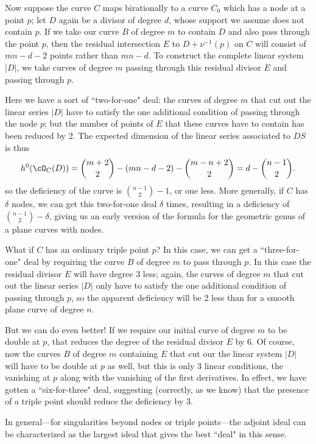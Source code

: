 Now suppose the curve $C$ maps birationally to a curve $C_0$ which has a node at a point $p$; let $D$ again be a divisor of degree $d$, whose support we assume does not contain $p$. If we take our curve $B$ of degree $m$ to contain $D$ and also pass through the point $p$, then the residual intersection $E$ to $D+\nu^{-1}(p)$ on $C$ will consist of $mn-d-2$ points rather than $mn-d$. To construct the complete linear system $|D|$, we take curves of degree $m$ passing through this residual divisor $E$ and passing through $p$.

Here we have a sort of ``two-for-one" deal: the curves of degree $m$ that cut out the linear series $|D|$ have to satisfy the one additional condition of passing through the node $p$; but the number of points of $E$ that these curves have to contain has been reduced by 2. The expected dimension of the linear series associated to $DS$ is thus
$$
h^0(\cO_C(D)) = \binom{m+2}{2} - (mn-d-2) -  \binom{m-n+2}{2} = d  - \binom{n-1}{2}.
$$
so the deficiency of the curve is $\binom{n-1}{2}-1$, or one less. More generally, if $C$ has $\delta$ nodes, we can get this two-for-one deal $\delta$ times, resulting in a deficiency of $\binom{n-1}{2} - \delta$, giving us an early version of the formula for the  geometric genus of a plane curves with nodes.

What if $C$ has an ordinary triple point $p$? In this case, we can get a ``three-for-one" deal by requiring the curve $B$ of degree $m$ to pass through $p$. In this case the residual divisor $E$ will have degree 3 less; again, the curves of degree $m$ that cut out the linear series $|D|$ only have to satisfy the one additional condition of passing through $p$, so the apparent deficiency will be 2 less than for a smooth plane curve of degree $n$.

But we can do even better! If we require our initial curve of degree $m$ to be double at $p$, that reduces the degree of the residual divisor $E$  by 6. Of course, now the curves $B$ of degree $m$ containing $E$ that cut our the linear system $|D|$  will have to be double at $p$ as well, but this is only 3 linear conditions, the vanishing at $p$ along with the vanishing of the first derivatives. In effect, we have gotten a ``six-for-three" deal, suggesting (correctly, as we know) that the presence of a triple point should reduce the deficiency by 3. 

In general---for singularities beyond nodes or triple points---the adjoint ideal can be characterized as the largest ideal that gives the best ``deal" in this sense. 


